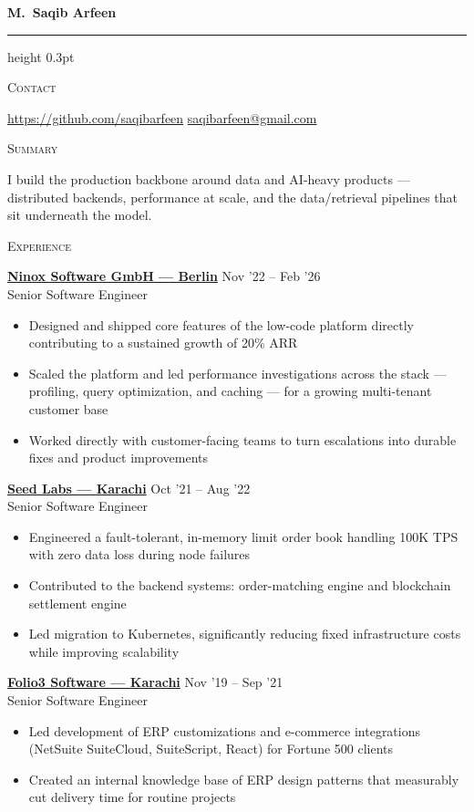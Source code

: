 \documentclass[10pt,a4paper]{article}
\newlength{\labelw}\setlength{\labelw}{2.2cm}
\newlength{\bodyw}\setlength{\bodyw}{\dimexpr\textwidth-\labelw-0.3cm\relax}
\newcommand{\cvsection}[2]{%
  \vspace{4pt}%
  \begin{minipage}[t]{\labelw}\raggedright\textsc{#1}\end{minipage}%
  \hfill
  \begin{minipage}[t]{\bodyw}#2\end{minipage}%
  \vspace{8pt}\par
}
\newcommand{\job}[3]{%
  \underline{\textbf{#1}} \hfill #3\\
  #2\par\vspace{1pt}%
}
\newenvironment{jobitems}
  {\begin{itemize}[leftmargin=12pt,itemsep=1pt,parsep=0pt,topsep=1pt,label=\textbullet]}
  {\end{itemize}\vspace{5pt}}
\begin{document}
{\bfseries M.\ Saqib Arfeen}\par
\vspace{6pt}
{\color{black}\hrule height 0.3pt}

\vspace{6pt}

\cvsection{Contact}{%
\href{https://github.com/saqibarfeen}{https://github.com/saqibarfeen} \hfill \href{mailto:saqibarfeen@gmail.com}{saqibarfeen@gmail.com}
}
\cvsection{Summary}{%
I build the production backbone around data and AI‑heavy products — distributed backends, performance at scale, and the data/retrieval pipelines that sit underneath the model.}
\vspace{4pt}
\cvsection{Experience}{%
\job{Ninox Software GmbH --- Berlin}{Senior Software Engineer}{Nov '22 -- Feb '26}
\begin{jobitems}
  \item Designed and shipped core features of the low-code platform directly contributing to a sustained growth of 20\% ARR
  \item Scaled the platform and led performance investigations across the
        stack --- profiling, query optimization, and caching --- for a growing
        multi-tenant customer base
  \item Worked directly with customer-facing teams to turn escalations into
        durable fixes and product improvements
\end{jobitems}
\job{Seed Labs --- Karachi}{Senior Software Engineer}{Oct '21 -- Aug '22}
\begin{jobitems}
  \item Engineered a fault-tolerant, in-memory limit order book handling 100K TPS with zero data loss during node failures
  \item Contributed to the backend systems: order-matching engine and
        blockchain settlement engine
  \item Led migration to Kubernetes, significantly reducing fixed
        infrastructure costs while improving scalability
\end{jobitems}
\job{Folio3 Software --- Karachi}{Senior Software Engineer}{Nov '19 -- Sep '21}
\begin{jobitems}
  \item Led development of ERP customizations and e-commerce integrations
        (NetSuite SuiteCloud, SuiteScript, React) for Fortune 500 clients
  \item Created an internal knowledge base of ERP design patterns that
        measurably cut delivery time for routine projects

\end{jobitems}}
\end{document}
